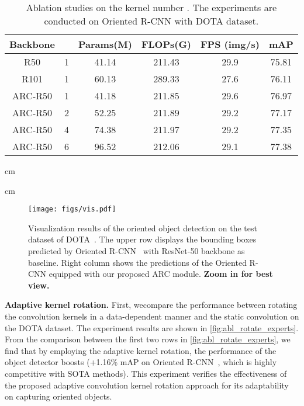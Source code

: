 \begin{table}[t]
  \centering
  \resizebox{0.99\linewidth}{!}
  {
  \begin{tabular}{c|c|ccc|c}
    \toprule
    Backbone &  & Params(M) & FLOPs(G) & FPS (img/s) & mAP \\  \midrule
R50  & 1 & 41.14 & 211.43 & 29.9 & 75.81 \\  R101 & 1 & 60.13 & 289.33 & 27.6 & 76.11 \\  \cmidrule{1-6}
ARC-R50 & 1 & 41.18 & 211.85 & 29.6 & 76.97 \\  ARC-R50 & 2 & 52.25 & 211.89 & 29.2 & 77.17 \\  ARC-R50 & 4 & 74.38 & 211.97 & 29.2 & 77.35 \\  ARC-R50 & 6 & 96.52 & 212.06 & 29.1 & 77.38 \\  \bottomrule
  \end{tabular}
  }
   cm
  \caption{Ablation studies on the kernel number . The experiments are conducted on Oriented R-CNN with DOTA dataset.}
  \label{tab:ablation_number_kernel}
   cm
\end{table}










\begin{figure*}[!t]
  \centering
  \texttt{[image: figs/vis.pdf]}
  \caption{Visualization results of the oriented object detection on the test dataset of DOTA~\cite{xia2018dota}. The upper row displays the bounding boxes predicted by Oriented R-CNN~\cite{xie2021oriented} with ResNet-50 backbone as baseline. Right column shows the predictions of the Oriented R-CNN equipped with our proposed ARC module. \textbf{Zoom in for best view.}}
  \label{fig:vis_box}
  \vspace{-0.1cm}
\end{figure*}


{\bf Adaptive kernel rotation.} First, wecompare the performance between rotating the convolution kernels in a data-dependent manner and the static convolution on the DOTA dataset. The experiment results are shown in \cref{fig:abl_rotate_experts}. From the comparison between the first two rows in \cref{fig:abl_rotate_experts}, we find that by employing the adaptive kernel rotation, the performance of the object detector boosts (+1.16\% mAP on Oriented R-CNN~\cite{xie2021oriented}, which is highly competitive with SOTA methods). This experiment verifies the effectiveness of the proposed adaptive convolution kernel rotation approach for its adaptability  on capturing oriented objects.


